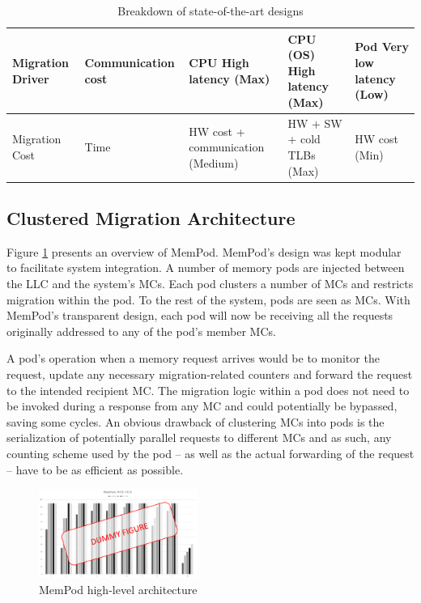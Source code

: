 \begin{table}[t]
\begin{tabularx}{\textwidth}{ |X|X|X|X|X| }
    Migration Driver & Communication cost & CPU \newline High latency \newline (Max) & CPU (OS) \newline High latency \newline (Max) & Pod \newline Very low latency \newline (Low)\\ \hline
    Migration Cost & Time & HW cost + communication \newline (Medium) & HW + SW + cold TLBs \newline (Max) & HW cost \newline (Min)\\ \hline
\end{tabularx}
  \caption{Breakdown of state-of-the-art designs}
  \label{tab:comparison}
\end{table}

\subsection{Clustered Migration Architecture}

 Figure \ref{fig:architecture_complete} presents an overview of MemPod. MemPod's design was kept modular to facilitate system integration. A number of memory pods are injected between the LLC and the system's MCs. Each pod clusters a number of MCs and restricts migration  within the pod. To the rest of the system, pods are seen as MCs. With MemPod's transparent design, each pod will now be receiving all the requests originally addressed to any of the pod's member MCs. 

A pod's operation when a memory request arrives would be to monitor the request, update any necessary migration-related counters and forward the request to the intended recipient MC. The migration logic within a pod does not need to be invoked during a response from any MC and could potentially be bypassed, saving some cycles. An obvious drawback of clustering MCs into pods is the serialization of potentially parallel requests to different MCs and as such, any counting scheme used by the pod -- as well as the actual forwarding of the request -- have to be as efficient as possible. 

\begin{figure}[h]
  \includegraphics[width=0.46\textwidth]{figures/dummy.pdf}
  \caption{MemPod high-level architecture}
  \label{fig:architecture_complete}
\end{figure}

